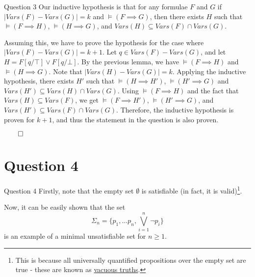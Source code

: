 \documentclass{beamer}
\begin{document}
{\begin{frame}{Question 3}
            Our inductive hypothesis is that for any formulae $F$ and $G$ if $|Vars(F) - Vars(G)| = k$ and $\vDash (F \implies G)$, then there exists $H$ such that $\vDash (F \implies H)$, $\vDash (H \implies G)$, and $Vars(H) \subseteq Vars(F) \cap Vars(G)$.

            Assuming this, we have to prove the hypothesis for the case where $|Vars(F) - Vars(G)| = k + 1$. Let $q \in Vars(F) - Vars(G)$, and let $H = F[q/\top] \lor F[q/\bot]$. By the previous lemma, we have $\vDash (F \implies H)$ and $\vDash (H \implies G)$. Note that $|Vars(H) - Vars(G)| = k$. Applying the inductive hypothesis, there exists $H'$ such that $\vDash (H \implies H')$, $\vDash (H' \implies G)$ and $Vars(H') \subseteq Vars(H) \cap Vars(G)$. Using $\vDash (F \implies H)$ and the fact that $Vars(H) \subseteq Vars(F)$, we get $\vDash (F \implies H')$, $\vDash (H' \implies G)$, and $Vars(H') \subseteq Vars(F) \cap Vars(G)$. Therefore, the inductive hypothesis is proven for $k + 1$, and thus the statement in the question is also proven.

            $\qed$
        \end{frame}
    }
    \section{Question 4}
    {
        \begin{frame}{Question 4}
            Firstly, note that the empty set $\emptyset$ is satisfiable (in fact, it is valid)\footnote{This is because all universally quantified propositions over the empty set are true - these are known as \href{https://en.wikipedia.org/wiki/Vacuous_truth}{vacuous truths}.}. 

            Now, it can be easily shown that the set
            \begin{equation*}
                \Sigma_{n} = \{p_{1}, \dots p_{n}, \bigvee\limits_{i = 1}^{n} \neg p_{i}\}
            \end{equation*} is an example of a minimal unsatisfiable set for $n \geq 1$.
        \end{frame}
    }
\end{document}
